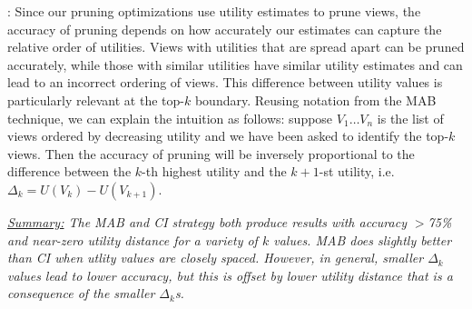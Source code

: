  :
 Since our pruning optimizations use utility estimates to prune views, 
 the accuracy of pruning depends on how accurately
 our estimates can capture the relative order of utilities.
 Views with utilities that are spread apart can be pruned accurately, while
 those with similar utilities have similar utility estimates and can 
 lead to an incorrect ordering of views.
 This difference between utility values is particularly relevant at the top-$k$
 boundary.
 Reusing notation from the MAB technique, we can explain the intuition as follows: 
 suppose $V_1 \ldots V_n$ is the list of views ordered by decreasing 
 utility and we have been asked to identify the top-$k$ views.
 Then the accuracy of pruning will be inversely proportional to the difference between
 the $k$-th highest utility and the $k+1$-st utility, 
 i.e. $\Delta_k = U(V_k) - U(V_{k+1})$.
 

{\em \underline{Summary:} The MAB and CI strategy both produce results with 
accuracy $>$75\% and near-zero utility distance for a variety of $k$ values.
MAB does slightly better than CI when utlity values are closely spaced.
However, in general, smaller $\Delta_k$ values lead to lower accuracy, but this is offset by
lower utility distance that is a consequence of the smaller $\Delta_k$s. 
}


